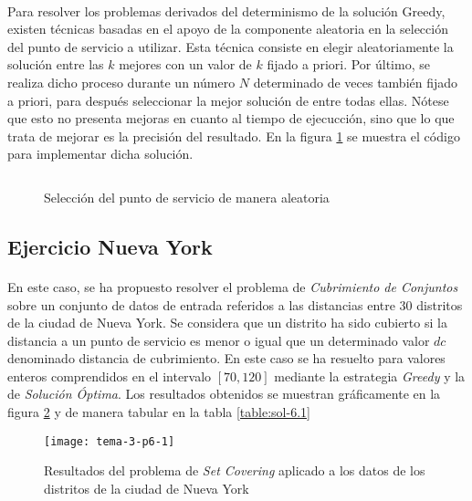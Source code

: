 \documentclass[spanish]{article}
\begin{document}
		\paragraph{}
		Para resolver los problemas derivados del determinismo de la solución Greedy, existen técnicas basadas en el apoyo de la componente aleatoria en la selección del punto de servicio a utilizar. Esta técnica consiste en elegir aleatoriamente la solución entre las $k$ mejores con un valor de $k$ fijado a priori. Por último, se realiza dicho proceso durante un número $N$ determinado de veces también fijado a priori, para después seleccionar la mejor solución de entre todas ellas. Nótese que esto no presenta mejoras en cuanto al tiempo de ejecucción, sino que lo que trata de mejorar es la precisión del resultado. En la figura \ref{code:random-greedy} se muestra el código para implementar dicha solución.

		\begin{figure}[h]
			\centering
			\inputminted{basic}{./code/random-greedy.mos}
			\caption{Selección del punto de servicio de manera aleatoria}
			\label{code:random-greedy}
		\end{figure}


		\subsection{Ejercicio Nueva York}
		\label{sec:e-6.1}

			\paragraph{}
			En este caso, se ha propuesto resolver el problema de \emph{Cubrimiento de Conjuntos} sobre un conjunto de datos de entrada referidos a las distancias entre $30$ distritos de la ciudad de Nueva York. Se considera que un distrito ha sido cubierto si la distancia a un punto de servicio es menor o igual que un determinado valor $dc$ denominado distancia de cubrimiento. En este caso se ha resuelto para valores enteros comprendidos en el intervalo $[70, 120]$ mediante la estrategia \emph{Greedy} y la de \emph{Solución Óptima}. Los resultados obtenidos se muestran gráficamente en la figura \ref{fig:sol-6.1} y de manera tabular en la tabla \ref{table:sol-6.1}


			\begin{figure}[h]
				\begin{center}
					\texttt{[image: tema-3-p6-1]}
				\end{center}
				\caption{Resultados del problema de \emph{Set Covering} aplicado a los datos de los distritos de la ciudad de Nueva York}
				\label{fig:sol-6.1}
			\end{figure}
\end{document}
